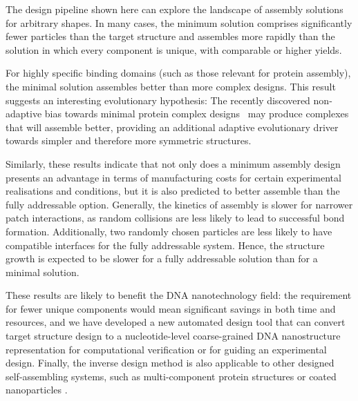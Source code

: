 The design pipeline shown here can explore the landscape of assembly solutions for arbitrary shapes. In many cases, the minimum solution comprises significantly fewer particles than the target structure and assembles more rapidly than the solution in which every component is unique, with comparable or higher yields. 

For highly specific binding domains (such as those relevant for protein assembly), the minimal solution assembles better than more complex designs. This result suggests an interesting evolutionary hypothesis:  The recently discovered non-adaptive bias towards minimal protein complex designs~\cite{johnston2021} may produce complexes that will assemble better, providing an additional adaptive evolutionary driver towards simpler and therefore more symmetric structures.

Similarly, these results indicate that not only does a minimum assembly design presents an advantage in terms of manufacturing costs for certain experimental realisations and conditions, but it is also predicted to better assemble than the fully addressable option. Generally, the kinetics of assembly is slower for narrower patch interactions, as random collisions are less likely to lead to successful bond formation. Additionally, two randomly chosen particles are less likely to have compatible interfaces for the fully addressable system. Hence, the structure growth is expected to be slower for a fully addressable solution than for a minimal solution.

These results are likely to benefit the DNA nanotechnology field: the requirement for fewer unique components would mean significant savings in both time and resources, and we have developed a new automated design tool that can convert target structure design to a nucleotide-level coarse-grained DNA nanostructure representation for computational verification or for guiding an experimental design. Finally, the inverse design method is also applicable to other designed self-assembling systems, such as multi-component protein structures or coated nanoparticles \cite{zhu2021protein,xiong2020three}.